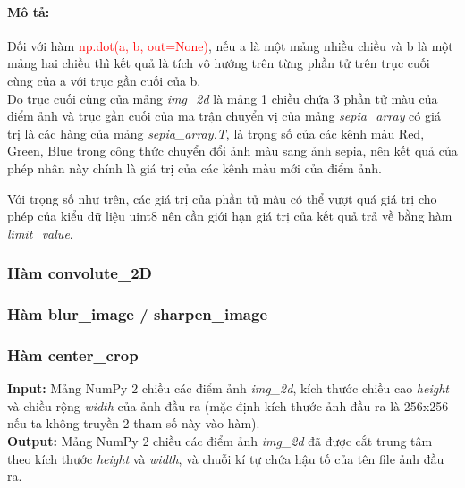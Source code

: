 \documentclass[]{article}
\begin{document}
\paragraph{Mô tả:}
Đối với hàm \textcolor{red}{np.dot(a, b, out=None)}, nếu a là một mảng nhiều chiều và b là một mảng hai chiều thì kết quả là tích vô hướng trên từng phần tử trên trục cuối cùng của a với trục gần cuối của b.\\
Do trục cuối cùng của mảng \textit{img\_2d} là mảng 1 chiều chứa 3 phần tử màu của điểm ảnh và trục gần cuối của ma trận chuyển vị của mảng \textit{sepia\_array} có giá trị là các hàng của mảng \textit{sepia\_array.T}, là trọng số của các kênh màu Red, Green, Blue trong công thức chuyển đổi ảnh màu sang ảnh sepia, nên kết quả của phép nhân này chính là giá trị của các kênh màu mới của điểm ảnh. \par
Với trọng số như trên, các giá trị của phần tử màu có thể vượt quá giá trị cho phép của kiểu dữ liệu uint8 nên cần giới hạn giá trị của kết quả trả về bằng hàm \textit{limit\_value}.

\subsubsection{Hàm convolute\_2D}
\subsubsection{Hàm blur\_image / sharpen\_image}

\subsubsection{Hàm center\_crop}
\textbf{Input:} Mảng NumPy 2 chiều các điểm ảnh \textit{img\_2d}, kích thước chiều cao \textit{height} và chiều rộng \textit{width} của ảnh đầu ra (mặc định kích thước ảnh đầu ra là 256x256 nếu ta không truyền 2 tham số này vào hàm). \\
\textbf{Output:} Mảng NumPy 2 chiều các điểm ảnh \textit{img\_2d} đã được cắt trung tâm theo kích thước \textit{height} và \textit{width}, và chuỗi kí tự chứa hậu tố của tên file ảnh đầu ra. \\
\end{document}
